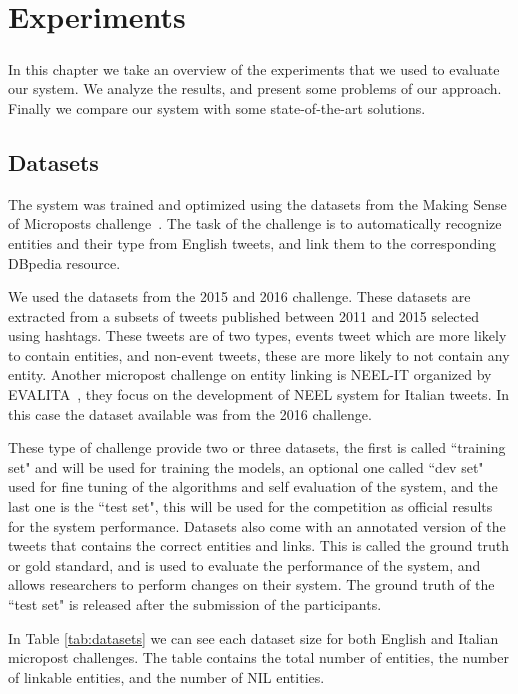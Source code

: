 
\chapter{Experiments}


\paragraph{}
In this chapter we take an overview of the experiments that we used to evaluate our system. We analyze the results, and present some problems of our approach. Finally we compare our system with some state-of-the-art solutions.


\section{Datasets}
The system was trained and optimized using the datasets from the Making Sense of Microposts challenge~\cite{rizzo2015making}. The task of the challenge is to automatically recognize entities and their type from English tweets, and link them to the corresponding DBpedia resource.  

We used the datasets from the 2015 and 2016 challenge. These datasets are extracted from a subsets of tweets published between 2011 and 2015 selected using hashtags. These tweets are of two types, events tweet which are more likely to contain entities, and non-event tweets, these are more likely to not contain any entity. 
Another micropost challenge on entity linking is NEEL-IT organized by EVALITA~\cite{basile2016evalita}, they focus on the development of NEEL system for Italian tweets. In this case the dataset available was from the 2016 challenge. 


These type of challenge provide two or three datasets, the first is called ``training set" and will be used for training the models, an optional one called ``dev set" used for fine tuning of the algorithms and self evaluation of the system, and the last one is the ``test set", this will be used for the competition as official results for the system performance. Datasets also come with an annotated version of the tweets that contains the correct entities and links. This is called the ground truth or gold standard, and is used to evaluate the performance of the system, and allows researchers to perform changes on their system. The ground truth of the ``test set" is released after the submission of the participants. 

In Table \ref{tab:datasets} we can see each dataset size for both English and Italian micropost challenges. The table contains the total number of entities, the number of linkable entities, and the number of NIL entities.

